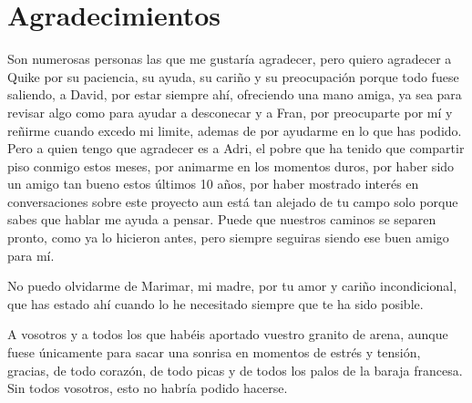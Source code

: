 \chapter{Agradecimientos}

Son numerosas personas las que me gustaría agradecer, pero quiero agradecer a Quike por su paciencia, su ayuda, su cariño y su preocupación porque todo fuese saliendo, a David, por estar siempre ahí, ofreciendo una mano amiga, ya sea para revisar algo como para ayudar a desconecar y  a Fran, por preocuparte por mí y reñirme cuando excedo mi limite, ademas de por ayudarme en lo que has podido. Pero a quien tengo que agradecer es a Adri, el pobre que ha tenido que compartir piso conmigo estos meses,  por animarme en los momentos duros,  por haber sido un amigo tan bueno estos últimos 10 años, por haber mostrado interés en conversaciones sobre este proyecto aun está tan alejado de tu campo solo porque sabes que hablar me ayuda a pensar. Puede que nuestros caminos se separen pronto, como ya lo hicieron antes, pero siempre seguiras siendo ese buen amigo para mí.

No puedo olvidarme de Marimar, mi madre, por tu amor y cariño incondicional, que has estado ahí cuando lo he necesitado siempre que te ha sido posible.

A vosotros y a todos los que habéis aportado vuestro granito de arena, aunque fuese únicamente para sacar una sonrisa en momentos de estrés y tensión, gracias, de todo corazón, de todo picas y de todos los palos de la baraja francesa. Sin todos vosotros, esto no habría podido hacerse.